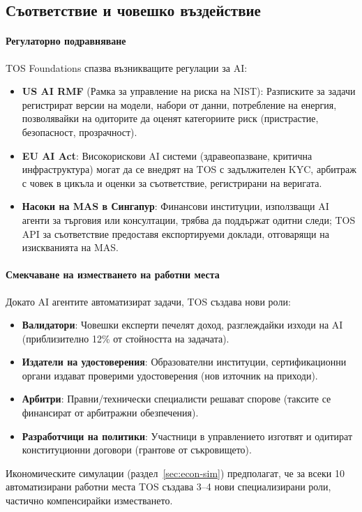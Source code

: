 \documentclass[11pt]{article}
\begin{document}
\subsection{Съответствие и човешко въздействие}
\paragraph{Регулаторно подравняване} TOS Foundations спазва възникващите регулации за AI:
\begin{itemize}[noitemsep]
  \item \textbf{US AI RMF} (Рамка за управление на риска на NIST): Разписките за задачи регистрират версии на модели, набори от данни, потребление на енергия, позволявайки на одиторите да оценят категориите риск (пристрастие, безопасност, прозрачност).
  \item \textbf{EU AI Act}: Високорискови AI системи (здравеопазване, критична инфраструктура) могат да се внедрят на TOS с задължителен KYC, арбитраж с човек в цикъла и оценки за съответствие, регистрирани на веригата.
  \item \textbf{Насоки на MAS в Сингапур}: Финансови институции, използващи AI агенти за търговия или консултации, трябва да поддържат одитни следи; TOS API за съответствие предоставя експортируеми доклади, отговарящи на изискванията на MAS.
\end{itemize}

\paragraph{Смекчаване на изместването на работни места} Докато AI агентите автоматизират задачи, TOS създава нови роли:
\begin{itemize}[noitemsep]
  \item \textbf{Валидатори}: Човешки експерти печелят доход, разглеждайки изходи на AI (приблизително 12\% от стойността на задачата).
  \item \textbf{Издатели на удостоверения}: Образователни институции, сертификационни органи издават проверими удостоверения (нов източник на приходи).
  \item \textbf{Арбитри}: Правни/технически специалисти решават спорове (таксите се финансират от арбитражни обезпечения).
  \item \textbf{Разработчици на политики}: Участници в управлението изготвят и одитират конституционни договори (грантове от съкровището).
\end{itemize}
Икономическите симулации (раздел~\ref{sec:econ-sim}) предполагат, че за всеки 10 автоматизирани работни места TOS създава 3--4 нови специализирани роли, частично компенсирайки изместването.
\end{document}

